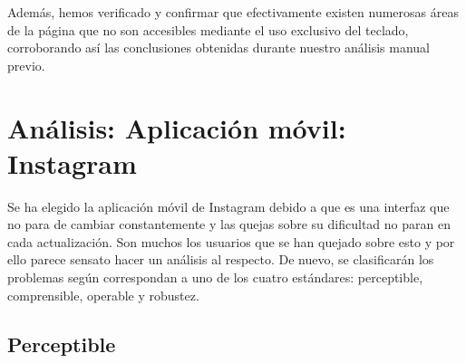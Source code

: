\documentclass{article}
\begin{document}
Además, hemos verificado y confirmar que efectivamente existen numerosas áreas de la página que no son accesibles mediante el uso exclusivo del teclado, corroborando así las conclusiones obtenidas durante nuestro análisis manual previo.


\newpage
\newpage
\newpage
\section{Análisis: Aplicación móvil: Instagram}
Se ha elegido la aplicación móvil de Instagram debido a que es una interfaz que no para de cambiar constantemente y las quejas sobre su dificultad no paran en cada actualización. Son muchos los usuarios que se han quejado sobre esto y por ello parece sensato hacer un análisis al respecto. De nuevo, se clasificarán los problemas según correspondan a uno de los cuatro estándares: perceptible, comprensible, operable y robustez.
\subsection{Perceptible}
\end{document}
